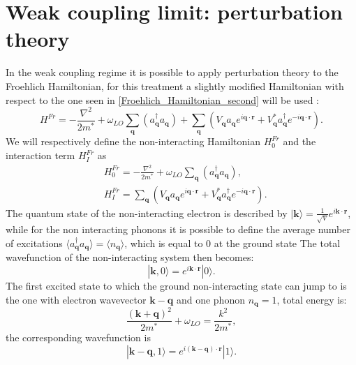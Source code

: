 \documentclass[12pt, a4paper]{report}
\numberwithin{equation}{section}
\begin{document}
\section{Weak coupling limit: perturbation theory}
In the weak coupling regime it is possible to apply perturbation theory to the Froehlich Hamiltonian, for this treatment a slightly modified 
Hamiltonian with respect to the one seen in \ref{Froehlich_Hamiltonian_second} will be used \cite{alexandrov2010advances}:
\begin{equation}
    H^{Fr}=-\frac{\nabla^2}{2m^*}+\omega_{LO}\sum_{\mathbf{q}}(a_\mathbf{q}^\dagger a_\mathbf{q})+\sum_{\mathbf{q}}(V_\mathbf{q}a_\mathbf{q}e^{i\mathbf{q}\cdot\mathbf{r}}+V^*_\mathbf{q}a^\dagger_\mathbf{q}e^{-i\mathbf{q}\cdot\mathbf{r}}).
\end{equation}
We will respectively define the non-interacting Hamiltonian $H_0^{Fr}$ and the interaction term $H_I^{Fr}$ as
\begin{equation}
\begin{split}
    &H_0^{Fr}=-\frac{\nabla^2}{2m^*}+\omega_{LO}\sum_{\mathbf{q}}(a_\mathbf{q}^\dagger a_\mathbf{q}),\\
    &H_I^{Fr}=\sum_{\mathbf{q}}(V_\mathbf{q}a_\mathbf{q}e^{i\mathbf{q}\cdot\mathbf{r}}+V^*_\mathbf{q}a^\dagger_\mathbf{q}e^{-i\mathbf{q}\cdot\mathbf{r}}).
\end{split}
\end{equation}
The quantum state of the non-interacting electron is described by $|\mathbf{k}\rangle=\frac{1}{\sqrt{V}}e^{i\mathbf{k}\cdot\mathbf{r}}$, 
while for the non interacting phonons it is possible to define the average number of excitations $\langle a^\dagger_\mathbf{q}a_\mathbf{q}\rangle=\langle n_\mathbf{q}\rangle$, 
which is equal to 0 at the ground state
The total wavefunction of the non-interacting system then becomes:
\begin{equation}
    |{\mathbf{k},0}\rangle=e^{i\mathbf{k}\cdot\mathbf{r}}|0\rangle.
\end{equation}
The first excited state to which the ground non-interacting state can jump to is the one with electron wavevector $\mathbf{k}-\mathbf{q}$ and 
one phonon $n_\mathbf{q}=1$, total energy is:
\begin{equation}
    \frac{(\mathbf{k}+\mathbf{q})^2}{2m^*}+\omega_{LO}=\frac{k^2}{2m^*},
\end{equation}
the corresponding wavefunction is
\begin{equation}
    |\mathbf{k}-\mathbf{q},1\rangle =e^{i(\mathbf{k}-\mathbf{q})\cdot \mathbf{r}}|1\rangle.
\end{equation}
\end{document}
